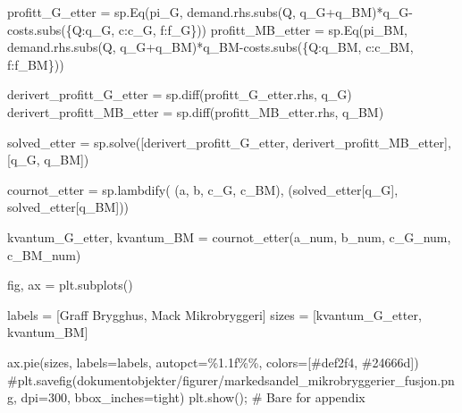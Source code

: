 \documentclass[
  12pt,
  a4paper,
  DIV=11,
  numbers=noendperiod]{scrartcl}
\newenvironment{Shaded}{\begin{snugshade}}{\end{snugshade}}
\newcommand{\CommentTok}[1]{\textcolor[rgb]{0.37,0.37,0.37}{#1}}
\newcommand{\NormalTok}[1]{\textcolor[rgb]{0.00,0.23,0.31}{#1}}
\newcommand{\OperatorTok}[1]{\textcolor[rgb]{0.37,0.37,0.37}{#1}}
\newcommand{\SpecialCharTok}[1]{\textcolor[rgb]{0.37,0.37,0.37}{#1}}
\newcommand{\StringTok}[1]{\textcolor[rgb]{0.13,0.47,0.30}{#1}}
\begin{document}
\begin{Shaded}
\begin{Highlighting}[]
\NormalTok{profitt\_G\_etter }\OperatorTok{=}\NormalTok{ sp.Eq(pi\_G, demand.rhs.subs(Q, q\_G}\OperatorTok{+}\NormalTok{q\_BM)}\OperatorTok{*}\NormalTok{q\_G}\OperatorTok{{-}}\NormalTok{costs.subs(\{Q:q\_G, c:c\_G, f:f\_G\}))}
\NormalTok{profitt\_MB\_etter }\OperatorTok{=}\NormalTok{ sp.Eq(pi\_BM, demand.rhs.subs(Q, q\_G}\OperatorTok{+}\NormalTok{q\_BM)}\OperatorTok{*}\NormalTok{q\_BM}\OperatorTok{{-}}\NormalTok{costs.subs(\{Q:q\_BM, c:c\_BM, f:f\_BM\}))}
\end{Highlighting}
\end{Shaded}

\begin{Shaded}
\begin{Highlighting}[]
\NormalTok{derivert\_profitt\_G\_etter }\OperatorTok{=}\NormalTok{ sp.diff(profitt\_G\_etter.rhs, q\_G)}
\NormalTok{derivert\_profitt\_MB\_etter }\OperatorTok{=}\NormalTok{ sp.diff(profitt\_MB\_etter.rhs, q\_BM)}

\NormalTok{solved\_etter }\OperatorTok{=}\NormalTok{ sp.solve([derivert\_profitt\_G\_etter, derivert\_profitt\_MB\_etter], [q\_G, q\_BM])}
\end{Highlighting}
\end{Shaded}

\begin{Shaded}
\begin{Highlighting}[]
\NormalTok{cournot\_etter }\OperatorTok{=}\NormalTok{ sp.lambdify(}
\NormalTok{    (a, b, c\_G, c\_BM), }
\NormalTok{    (solved\_etter[q\_G], solved\_etter[q\_BM]))}
    
\NormalTok{kvantum\_G\_etter, kvantum\_BM }\OperatorTok{=}\NormalTok{ cournot\_etter(a\_num, b\_num, c\_G\_num, c\_BM\_num)}
\end{Highlighting}
\end{Shaded}

\begin{Shaded}
\begin{Highlighting}[]
\NormalTok{fig, ax }\OperatorTok{=}\NormalTok{ plt.subplots()}

\NormalTok{labels }\OperatorTok{=}\NormalTok{ [}\StringTok{\textquotesingle{}Graff Brygghus\textquotesingle{}}\NormalTok{, }\StringTok{\textquotesingle{}Mack Mikrobryggeri\textquotesingle{}}\NormalTok{]}
\NormalTok{sizes }\OperatorTok{=}\NormalTok{ [kvantum\_G\_etter, kvantum\_BM]}

\NormalTok{ax.pie(sizes, labels}\OperatorTok{=}\NormalTok{labels, autopct}\OperatorTok{=}\StringTok{\textquotesingle{}}\SpecialCharTok{\%1.1f\%\%}\StringTok{\textquotesingle{}}\NormalTok{, colors}\OperatorTok{=}\NormalTok{[}\StringTok{\textquotesingle{}\#def2f4\textquotesingle{}}\NormalTok{, }\StringTok{\textquotesingle{}\#24666d\textquotesingle{}}\NormalTok{])}
\CommentTok{\#plt.savefig(\textquotesingle{}dokumentobjekter/figurer/markedsandel\_mikrobryggerier\_fusjon.png\textquotesingle{}, dpi=300, bbox\_inches=\textquotesingle{}tight\textquotesingle{})}
\NormalTok{plt.show()}\OperatorTok{;} \CommentTok{\# Bare for appendix}
\end{Highlighting}
\end{Shaded}
\end{document}
